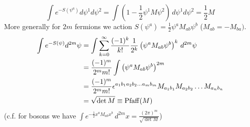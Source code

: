 \documentclass{article}
\begin{document}
\[
\int e^{-S(\psi^a)} d\psi^1 d\psi^2 = \int \left( 1- \frac{1}{2} \psi^1 M \psi^2 \right) \, d\psi^1 d\psi^2 = \frac{1}{2}M
\]
More generally for $2m$ fermions we action $S(\psi^a) = \frac{1}{2} \psi^a M_{ab} \psi^b$ ($M_{ab}=-M_{ba})$. 
\begin{align*}
    \int e^{-S(\psi)} d^{2m}\psi &= \int \sum_{k=0}^\infty \frac{(-1)^k}{k!} \frac{1}{2^k} \left( \psi^a M_{ab} \psi^b \right)^k \, d^{2m}\psi \\
    &=\frac{(-1)^m}{2^m m!} \int \left( \psi^a M_{ab} \psi^b \right)^{2m} \\
    &= \frac{(-1)^m}{2^m m!} \epsilon^{a_1 b_1 a_2 b_2 \dots a_m b_m} M_{a_1 b_1} M_{a_2 b_2} \dots M_{a_n b_n} \\
    &= \sqrt{\det M} \equiv \operatorname{Pfaff}(M)
\end{align*}
(c.f. for bosons we have $\int e^{-\frac{1}{2} x^a M_{ab} x^b} \, d^{2m} x = \frac{(2\pi)^m}{\sqrt{\det M}} $)
\end{document}
